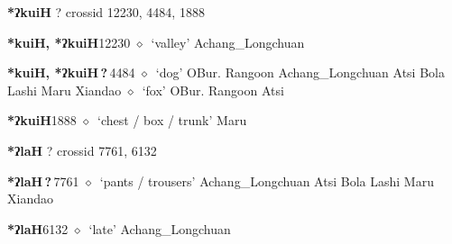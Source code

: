 \item
\textbf{*ʔkuiH}
?
  {\tiny crossid 12230, 4484, 1888}
  \begin{list}{}{\leftmargin=1.5em \itemindent=-1.5em}
  \item {\footnotesize \textbf{*kuiH, *ʔkuiH}}{\tiny 12230}
         $\diamond$~`valley'
         Achang\_Longchuan 
  \item {\footnotesize \textbf{*kuiH, *ʔkuiH\,?\,}}{\tiny 4484}
\hspace{1ex}
         $\diamond$~`dog'
         OBur. 
\hspace{1ex}
         Rangoon 
\hspace{1ex}
         Achang\_Longchuan 
\hspace{1ex}
         Atsi 
\hspace{1ex}
         Bola 
\hspace{1ex}
         Lashi 
\hspace{1ex}
         Maru 
\hspace{1ex}
         Xiandao 
\hspace{1ex}
         $\diamond$~`fox'
         OBur. 
\hspace{1ex}
         Rangoon 
\hspace{1ex}
         Atsi 
  \item {\footnotesize \textbf{*ʔkuiH}}{\tiny 1888}
\hspace{1ex}
         $\diamond$~`chest / box / trunk'
         Maru 
  \end{list}
\item
\textbf{*ʔlaH}
?
  {\tiny crossid 7761, 6132}
  \begin{list}{}{\leftmargin=1.5em \itemindent=-1.5em}
  \item {\footnotesize \textbf{*ʔlaH\,?\,}}{\tiny 7761}
         $\diamond$~`pants / trousers'
         Achang\_Longchuan 
\hspace{1ex}
         Atsi 
\hspace{1ex}
         Bola 
\hspace{1ex}
         Lashi 
\hspace{1ex}
         Maru 
\hspace{1ex}
         Xiandao 
  \item {\footnotesize \textbf{*ʔlaH}}{\tiny 6132}
\hspace{1ex}
         $\diamond$~`late'
         Achang\_Longchuan 
  \end{list}
